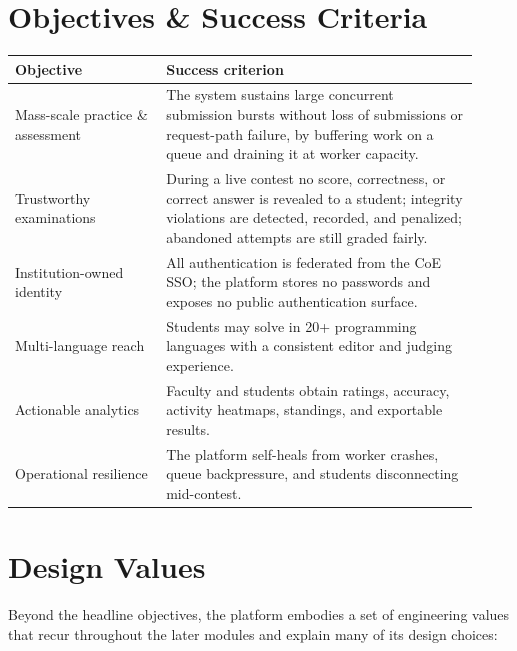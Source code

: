 \documentclass[12pt,a4paper,oneside]{report}
\begin{document}
\section{Objectives \& Success Criteria}
\begin{longtable}{@{}p{0.30\linewidth} p{0.62\linewidth}@{}}
\toprule
\textbf{Objective} & \textbf{Success criterion}\\
\midrule
\endhead
Mass-scale practice \& assessment & The system sustains large concurrent
submission bursts without loss of submissions or request-path failure, by
buffering work on a queue and draining it at worker capacity.\\
Trustworthy examinations & During a live contest no score, correctness, or
correct answer is revealed to a student; integrity violations are detected,
recorded, and penalized; abandoned attempts are still graded fairly.\\
Institution-owned identity & All authentication is federated from the CoE SSO;
the platform stores no passwords and exposes no public authentication surface.\\
Multi-language reach & Students may solve in 20+ programming languages with a
consistent editor and judging experience.\\
Actionable analytics & Faculty and students obtain ratings, accuracy, activity
heatmaps, standings, and exportable results.\\
Operational resilience & The platform self-heals from worker crashes, queue
backpressure, and students disconnecting mid-contest.\\
\bottomrule
\end{longtable}

\section{Design Values}
Beyond the headline objectives, the platform embodies a set of engineering
values that recur throughout the later modules and explain many of its design
choices:
\end{document}
